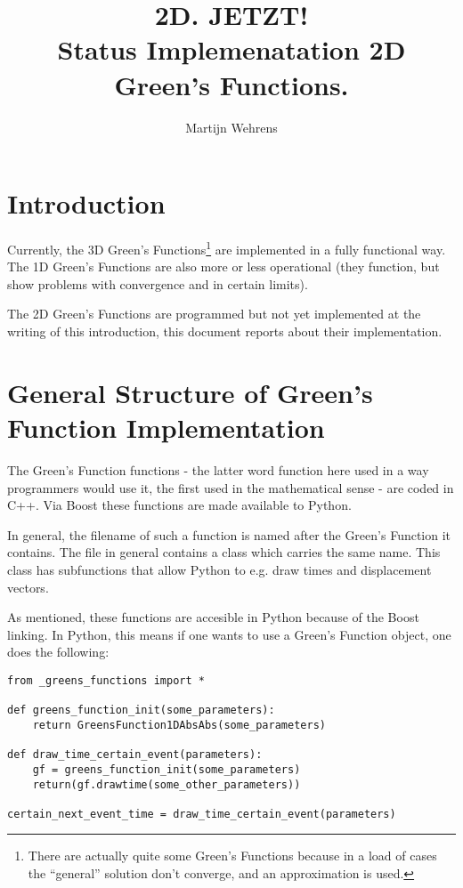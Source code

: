 \documentclass[a4paper,10pt]{article}
\title{2D. JETZT! \\ Status Implemenatation 2D Green's Functions.}
\author{Martijn Wehrens}
\begin{document}
\maketitle

\tableofcontents

\section{Introduction}

Currently, the 3D Green's Functions\footnote{There are actually quite some Green's Functions because in a load of cases the ``general'' solution don't converge, and an approximation is used.} are implemented in a fully functional way. The 1D Green's Functions are also more or less operational (they function, but show problems with convergence and in certain limits).

The 2D Green's Functions are programmed but not yet implemented at the writing of this introduction, this document reports about their implementation. 

\section{General Structure of Green's Function Implementation}

The Green's Function functions - the latter word function here used in a way programmers would use it, the first used in the mathematical sense - are coded in C++. Via Boost these functions are made available to Python.

In general, the filename of such a function is named after the Green's Function it contains. The file in general contains a class which carries the same name. This class has subfunctions that allow Python to e.g. draw times and displacement vectors. 

As mentioned, these functions are accesible in Python because of the Boost linking. In Python, this means if one wants to use a Green's Function object, one does the following:

\label{GFusageexample}
\begin{verbatim}
from _greens_functions import *

def greens_function_init(some_parameters):
    return GreensFunction1DAbsAbs(some_parameters)

def draw_time_certain_event(parameters):
    gf = greens_function_init(some_parameters)
    return(gf.drawtime(some_other_parameters))

certain_next_event_time = draw_time_certain_event(parameters)

\end{verbatim}
\end{document}
